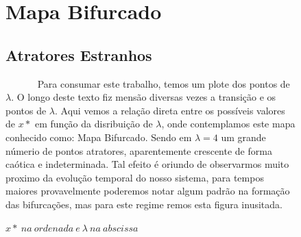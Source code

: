\documentclass[pdftex,12pt,a4paper]{article}
\begin{document}
\begin{figure}

\section{Mapa Bifurcado}

\subsection{Atratores Estranhos}

~~~~~~ Para consumar este trabalho, temos um plote dos pontos de $\lambda$. O longo deste texto fiz mensão diversas vezes a transição e os pontos de $\lambda$. Aqui vemos a relação direta entre os possíveis valores de $x*$ em função da disribuição de $\lambda$, onde contemplamos este mapa conhecido como: Mapa Bifurcado.  Sendo em $\lambda = 4$ um grande númerio de pontos atratores, aparentemente crescente de forma caótica e indeterminada. Tal efeito é oriundo de observarmos muito proximo da evolução temporal do nosso sistema, para tempos maiores provavelmente poderemos notar algum padrão na formação das bifurcações, mas para este regime remos esta figura inusitada. 

\centering
\caption{$0 \leq \lambda \leq 4.00$.}
\caption*{ $x*\ na\ ordenada\ e\ \lambda\ na\ abscissa$ }
\end{figure}
\end{document}
